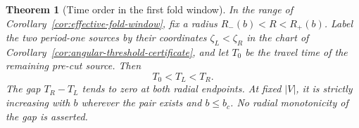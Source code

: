 \documentclass[11pt,a4paper]{article}
\newtheorem{theorem}{Theorem}[section]
\theoremstyle{remark}\newtheorem{remark}[theorem]{Remark}
\begin{document}
\begin{theorem}[Time order in the first fold window]
\label{thm:window-time-order}
In the range of Corollary~\ref{cor:effective-fold-window}, fix a radius
$R_-(b)<R<R_+(b)$. Label the two period-one sources by their coordinates
$\zeta_L<\zeta_R$ in the chart of Corollary~\ref{cor:angular-threshold-certificate}, and let $T_0$ be the
travel time of the remaining pre-cut source. Then
\begin{equation}\label{eq:window-time-order}
 T_0<T_L<T_R.
\end{equation}
The gap $T_R-T_L$ tends to zero at both radial endpoints. At fixed
$|V|$, it is strictly increasing with $b$ wherever the pair exists
and $b\le b_c$. No radial monotonicity of the gap is asserted.
\end{theorem}
\end{document}
